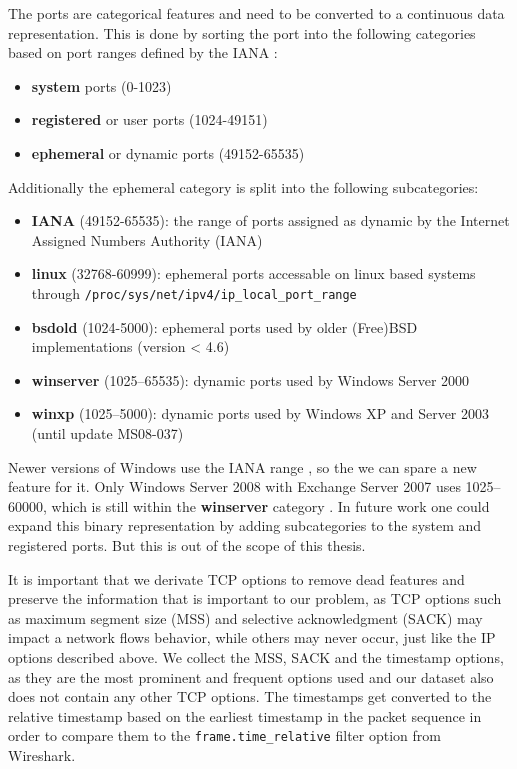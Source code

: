 \documentclass[
	ngerman,
	ruledheaders=section,%
	class=report,%
	thesis={type=bachelor},%
	accentcolor=9c,%
	custommargins=true,%
	marginpar=false,%
	parskip=half-,%
	fontsize=11pt,%
	twoside
]{tudapub}
\let\code\texttt
\begin{document}
The ports are categorical features and need to be converted to a continuous data representation.
This is done by sorting the port into the following categories based on port ranges defined by the IANA \cite{ServiceNameTransport}:
\begin{itemize}
    \item \textbf{system} ports (0-1023)
    \item \textbf{registered} or user ports (1024-49151)
    \item \textbf{ephemeral} or dynamic ports (49152-65535)
\end{itemize}
Additionally the ephemeral category is split into the following subcategories:
\begin{itemize}
    \item \textbf{IANA} (49152-65535): the range of ports assigned as dynamic by the Internet Assigned Numbers Authority (IANA) \cite{ServiceNameTransport}
    \item \textbf{linux} (32768-60999): ephemeral ports accessable on linux based systems through \code{/proc/sys/net/ipv4/ip\_local\_port\_range}
    \item \textbf{bsdold} (1024-5000): ephemeral ports used by older (Free)BSD implementations (version < 4.6) \cite{EphemeralPortRange}
    \item \textbf{winserver} (1025–65535): dynamic ports used by Windows Server 2000 \cite{DefaultDynamicPort} \cite{WhenYouTry}
    \item \textbf{winxp} (1025–5000): dynamic ports used by Windows XP \cite{CableGuyDecember} and Server 2003 (until update MS08-037) \cite{YouExperienceIssues}
\end{itemize}
Newer versions of Windows use the IANA range \cite{DefaultDynamicPort}, so the we can spare a new feature for it.
Only Windows Server 2008 with Exchange Server 2007 uses 1025–60000, which is still within the \textbf{winserver} category \cite{DefaultDynamicPort}.
In future work one could expand this binary representation by adding subcategories to the system and registered ports.
But this is out of the scope of this thesis.

It is important that we derivate TCP options to remove dead features and preserve the information that is important to our problem,
as TCP options such as maximum segment size (MSS) and selective acknowledgment (SACK) may impact a network flows behavior,
while others may never occur, just like the IP options described above.
We collect the MSS, SACK and the timestamp options,
as they are the most prominent and frequent options used and
our dataset also does not contain any other TCP options.
The timestamps get converted to the relative timestamp based on the earliest timestamp in the packet sequence in order to compare them to the \code{frame.time\_relative} filter option from Wireshark.
\end{document}
